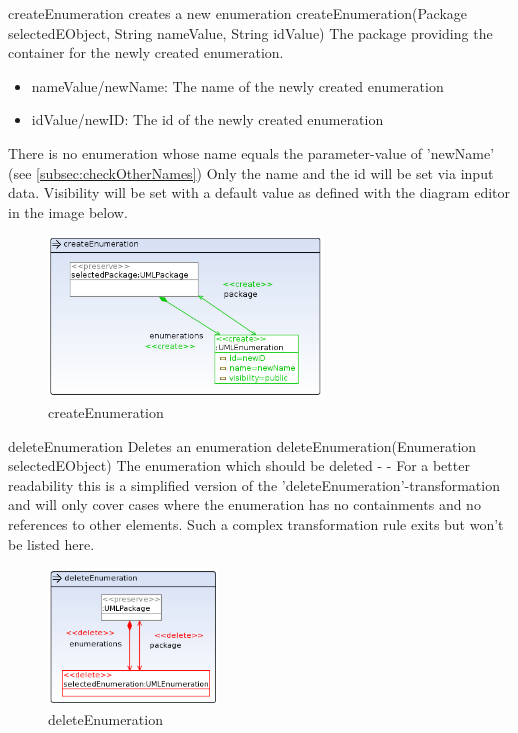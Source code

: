 \op
{createEnumeration}
{creates a new enumeration}
{createEnumeration(Package selectedEObject, String nameValue, String idValue)}
{The package providing the container for the newly created enumeration.}
{
\begin{itemize}
 \item nameValue/newName: The name of the newly created enumeration
 \item idValue/newID: The id of the newly created enumeration
\end{itemize}
}
{There is no enumeration whose name equals the parameter-value of 'newName' (see
\ref{subsec:checkOtherNames})}
{Only the name and the id will be set via input data. Visibility will be set
with a default value as defined with the diagram editor in the image below.}
\begin{figure}[H]
  \centering
  \includegraphics[width=0.65\textwidth]{pics/createEnumeration.png}
  \caption{createEnumeration}
  \label{createEnumeration}
\end{figure}
\op
{deleteEnumeration}
{Deletes an enumeration}
{deleteEnumeration(Enumeration selectedEObject)}
{The enumeration which should be deleted}
{-}
{-}
{For a better readability this is a simplified version of the
'deleteEnumeration'-transformation and will only cover cases where the
enumeration has no containments and no references to other elements. Such a
complex transformation rule exits but won't be listed here.}
\begin{figure}[H]
  \centering
  \includegraphics[width=0.4\textwidth]{pics/deleteEnumeration_emptyAndUnreferenced.png}
  \caption{deleteEnumeration}
  \label{deleteEnumeration}
\end{figure}
